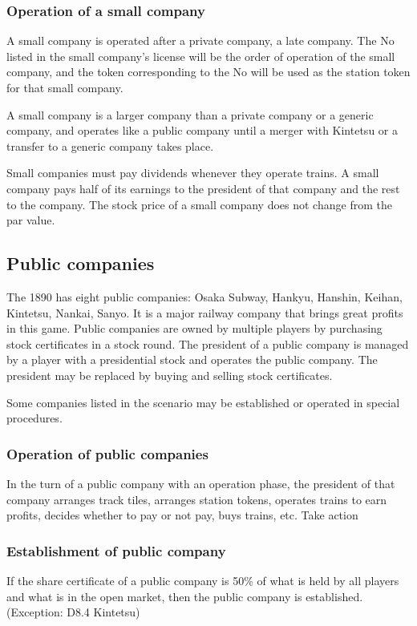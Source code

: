 \documentclass{article}
\begin{document}
\begin{CJK}{UTF8}{min}
\subsubsection{Operation of a small company}
A small company is operated after a private company, a late
company. The No listed in the small company's license will be the
order of operation of the small company, and the token corresponding
to the No will be used as the station token for that small company.

A small company is a larger company than a private company or a
generic company, and operates like a public company until a merger
with Kintetsu or a transfer to a generic company takes place.

Small companies must pay dividends whenever they operate trains. A
small company pays half of its earnings to the president of that
company and the rest to the company. The stock price of a small
company does not change from the par value.

\subsection{Public companies}
The 1890 has eight public companies: Osaka Subway, Hankyu, Hanshin,
Keihan, Kintetsu, Nankai, Sanyo. It is a major railway company that
brings great profits in this game. Public companies are owned by
multiple players by purchasing stock certificates in a stock
round. The president of a public company is managed by a player with a
presidential stock and operates the public company. The president may
be replaced by buying and selling stock certificates.

Some companies listed in the scenario may be established or operated
in special procedures.

\subsubsection{Operation of public companies}
In the turn of a public company with an operation phase, the president
of that company arranges track tiles, arranges station tokens,
operates trains to earn profits, decides whether to pay or not pay,
buys trains, etc. Take action

\subsubsection{Establishment of public company}
If the share certificate of a public company is 50\% of what is held
by all players and what is in the open market, then the public company
is established. (Exception: D8.4 Kintetsu)


\end{CJK}
\end{document}
